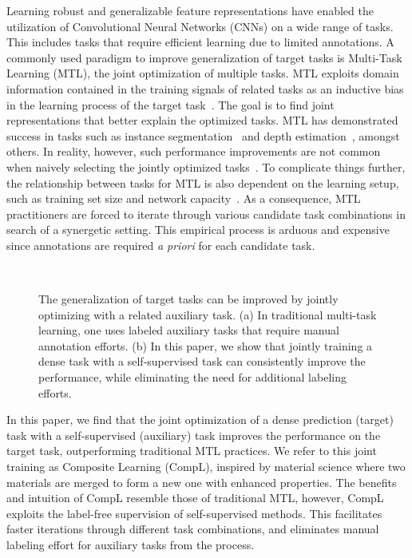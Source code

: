 \documentclass[10pt,twocolumn,letterpaper]{article}
\begin{document}
Learning robust and generalizable feature representations have enabled the utilization of Convolutional Neural Networks (CNNs) on a wide range of tasks.
This includes tasks that require efficient learning due to limited annotations.
A commonly used paradigm to improve generalization of target tasks is Multi-Task Learning (MTL), the joint optimization of multiple tasks. 
MTL exploits domain information contained in the training signals of related tasks as an inductive bias in the learning process of the target task~\cite{caruana1997multitask,caruana1998dozen}. 
The goal is to find joint representations that better explain the optimized tasks.
MTL has demonstrated success in tasks such as instance segmentation~\cite{dai2016instance} and depth estimation~\cite{chen2019towards}, amongst others.
In reality, however, such performance improvements are not common when naively selecting the jointly optimized tasks~\cite{kokkinos2017ubernet}.
To complicate things further, the relationship between tasks for MTL is also dependent on the learning setup, such as training set size and network capacity~\cite{standley2020tasks}.
As a consequence, MTL practitioners are forced to iterate through various candidate task combinations in search of a synergetic setting. 
This empirical process is arduous and expensive since annotations are required \emph{a priori} for each candidate task.

\begin{figure}
 \centering
~
\caption{The generalization of target tasks can be improved by jointly optimizing with a related auxiliary task. 
(a) In traditional multi-task learning, one uses labeled auxiliary tasks that require manual annotation efforts. 
(b) In this paper, we show that jointly training a dense task with a self-supervised task can consistently improve the performance, while eliminating the need for additional labeling efforts.
}
\vspace{-0.2in}
\label{fig:overview}
\end{figure}

In this paper, we find that the joint optimization of a dense prediction (target) task with a self-supervised (auxiliary) task improves the performance on the target task, outperforming traditional MTL practices. 
We refer to this joint training as Composite Learning (CompL), inspired by material science where two materials are merged to form a new one with enhanced properties. 
The benefits and intuition of CompL resemble those of traditional MTL, however, CompL exploits the label-free supervision of self-supervised methods.
This facilitates faster iterations through different task combinations, and eliminates manual labeling effort for auxiliary tasks from the process.
\end{document}
